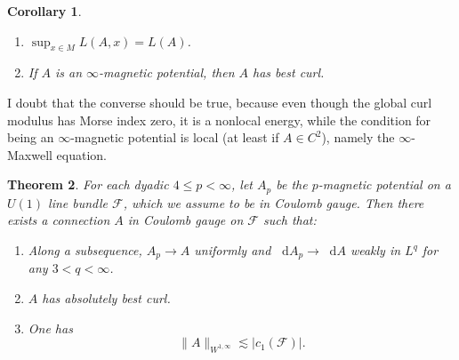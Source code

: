 \documentclass[reqno,11pt]{amsart}
\newcommand*\dif{\mathop{}\!\mathrm{d}}
\newtheorem{theorem}{Theorem}[section]
\newtheorem{corollary}[theorem]{Corollary}
\theoremstyle{definition}
\numberwithin{equation}{section}
\begin{document}
\begin{corollary}
\begin{enumerate}
\item $\sup_{x \in M} L(A, x) = L(A)$.
\item If $A$ is an $\infty$-magnetic potential, then $A$ has best curl.
\end{enumerate}
\end{corollary}

I doubt that the converse should be true, because even though the global curl modulus has Morse index zero, it is a nonlocal energy, while the condition for being an $\infty$-magnetic potential is local (at least if $A \in C^2$), namely the $\infty$-Maxwell equation.



\begin{theorem}
For each dyadic $4 \leq p < \infty$, let $A_p$ be the $p$-magnetic potential on a $U(1)$ line bundle $\mathscr F$, which we assume to be in Coulomb gauge.
Then there exists a connection $A$ in Coulomb gauge on $\mathscr F$ such that:
\begin{enumerate}
\item Along a subsequence, $A_p \to A$ uniformly and $\dif A_p \to \dif A$ weakly in $L^q$ for any $3 < q < \infty$.
\item $A$ has absolutely best curl.
\item One has 
$$\|A\|_{W^{1, \infty}} \lesssim |c_1(\mathscr F)|.$$
\end{enumerate}
\end{theorem}
\end{document}
